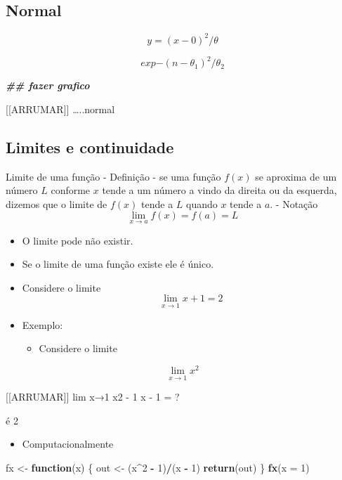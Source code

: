 \documentclass[
]{article}
\newenvironment{Shaded}{\begin{snugshade}}{\end{snugshade}}
\newcommand{\AttributeTok}[1]{\textcolor[rgb]{0.13,0.29,0.53}{#1}}
\newcommand{\ControlFlowTok}[1]{\textcolor[rgb]{0.13,0.29,0.53}{\textbf{#1}}}
\newcommand{\DecValTok}[1]{\textcolor[rgb]{0.00,0.00,0.81}{#1}}
\newcommand{\DocumentationTok}[1]{\textcolor[rgb]{0.56,0.35,0.01}{\textbf{\textit{#1}}}}
\newcommand{\FunctionTok}[1]{\textcolor[rgb]{0.13,0.29,0.53}{\textbf{#1}}}
\newcommand{\NormalTok}[1]{#1}
\newcommand{\OtherTok}[1]{\textcolor[rgb]{0.56,0.35,0.01}{#1}}
\newcommand{\SpecialCharTok}[1]{\textcolor[rgb]{0.81,0.36,0.00}{\textbf{#1}}}
\providecommand{\tightlist}{%
  \setlength{\itemsep}{0pt}\setlength{\parskip}{0pt}}
\begin{document}
\hypertarget{normal}{%
\subsection{Normal}\label{normal}}

\[ y= (x-0)^2/\theta\]

\[ exp{-(n - \theta_{1})^2/ \theta_{2}}\]

\begin{Shaded}
\begin{Highlighting}[]
\DocumentationTok{\#\# fazer grafico}
\end{Highlighting}
\end{Shaded}

{[}{[}ARRUMAR{]}{]} \ldots..normal

\hypertarget{limites-e-continuidade}{%
\subsection{Limites e continuidade}\label{limites-e-continuidade}}

Limite de uma função - Definição - se uma função \(f(x)\) se aproxima de
um número \(L\) conforme \(x\) tende a um número a vindo da direita ou
da esquerda, dizemos que o limite de \(f(x)\) tende a \(L\) quando \(x\)
tende a \(a\). - Notação \[\lim_{x \to a} f(x) = f(a) = L\]

\begin{itemize}
\item
  O limite pode não existir.
\item
  Se o limite de uma função existe ele é único.
\item
  Considere o limite \[\lim_{x \to 1} x+1 = 2\]
\item
  Exemplo:

  \begin{itemize}
  \tightlist
  \item
    Considere o limite
  \end{itemize}
\end{itemize}

\[\lim_{x \to 1} x^2\]

{[}{[}ARRUMAR{]}{]} lim x→1 x2 - 1 x - 1 = ?

é 2

\begin{itemize}
\tightlist
\item
  Computacionalmente
\end{itemize}

\begin{Shaded}
\begin{Highlighting}[]
\NormalTok{fx }\OtherTok{\textless{}{-}} \ControlFlowTok{function}\NormalTok{(x) \{}
\NormalTok{out }\OtherTok{\textless{}{-}}\NormalTok{ (x}\SpecialCharTok{\^{}}\DecValTok{2} \SpecialCharTok{{-}} \DecValTok{1}\NormalTok{)}\SpecialCharTok{/}\NormalTok{(x }\SpecialCharTok{{-}} \DecValTok{1}\NormalTok{)}
\FunctionTok{return}\NormalTok{(out)}
\NormalTok{\}}
\FunctionTok{fx}\NormalTok{(}\AttributeTok{x =} \DecValTok{1}\NormalTok{)}
\end{Highlighting}
\end{Shaded}
\end{document}
